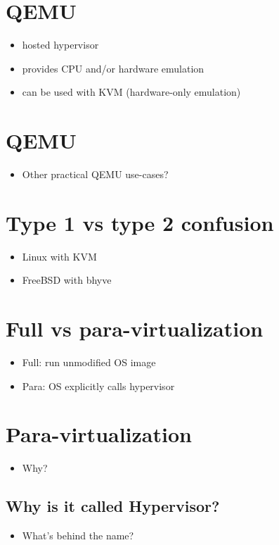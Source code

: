 \documentclass[11pt]{article}
\begin{document}
\section*{QEMU}
\label{sec:org3db92ce}
\begin{itemize}
\item hosted hypervisor
\item provides CPU and/or hardware emulation
\item can be used with KVM (hardware-only emulation)
\end{itemize}

\section*{QEMU}
\label{sec:org99a0717}
\begin{itemize}
\item Other practical QEMU use-cases?
\end{itemize}

\section*{Type 1 vs type 2 confusion}
\label{sec:orged94567}
\begin{itemize}
\item Linux with KVM
\item FreeBSD with bhyve
\end{itemize}

\section*{Full vs para-virtualization}
\label{sec:org1f63315}
\begin{itemize}
\item Full: run unmodified OS image
\item Para: OS explicitly calls hypervisor
\end{itemize}

\section*{Para-virtualization}
\label{sec:org15fae2b}
\begin{itemize}
\item Why?
\end{itemize}

\subsection*{Why is it called Hypervisor?}
\label{sec:org8369eb8}
\begin{itemize}
\item What's behind the name?
\end{itemize}
\end{document}
